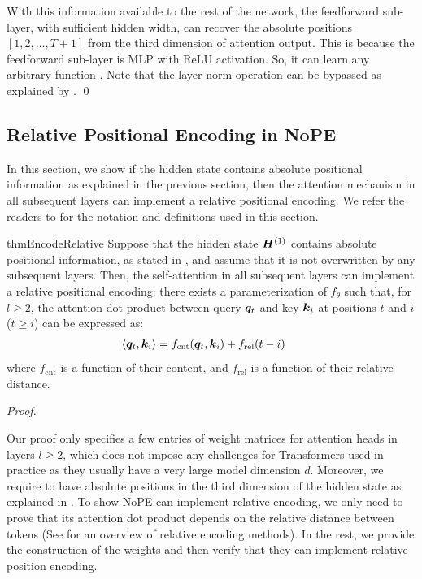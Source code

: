 \documentclass{article}
\begin{document}
With this information available to the rest of the network, the feedforward sub-layer, with sufficient hidden width, can recover the absolute positions $[1, 2, \dots, T+1]$ from the third dimension of attention output. This is because the feedforward sub-layer is MLP with ReLU activation. So, it can learn any arbitrary function \citep{Park2020:UniversalApproximation}. Note that the layer-norm operation can be bypassed as explained by \citet{Ekin2023:InContetLearning}. \qed

\subsection{Relative Positional Encoding in NoPE}
\label{sec:nope_relative_encoding_proof}
In this section, we show if the hidden state contains absolute positional information as explained in the previous section, then the attention mechanism in all subsequent layers can implement a relative positional encoding. We refer the readers to  for the notation and definitions used in this section.
\begin{mdframed}[style=MyFrame2]
  \begin{restatable*}{thm}{EncodeRelative}
    Suppose that the hidden state ${\bm{H}}^{(1)}$ contains absolute positional information, as stated in , and assume that it is not overwritten by any subsequent layers.
    Then, the self-attention in all subsequent layers can implement a relative positional encoding:
    there exists a parameterization of $f_\theta$ such that, for $l\ge 2$, the attention dot product between query ${\bm{q}}_t$ and key ${\bm{k}}_i$ at positions $t$ and $i$ ($t \ge i$) can be expressed as:
    \begin{equation}
      \begin{aligned}
        \langle {\bm{q}}_t, {\bm{k}}_i \rangle & = f_\mathrm{cnt}({\bm{q}}_t, {\bm{k}}_i) + f_\mathrm{rel}(t-i) \
      \end{aligned}
    \end{equation}
    where $f_\mathrm{cnt}$ is a function of their content, and $f_\mathrm{rel}$ is a function of their relative distance.
  \end{restatable*}
\end{mdframed}
\textit{Proof.}

Our proof only specifies a few entries of weight matrices for attention heads in layers $l\ge 2$, which does not impose any challenges for Transformers used in practice as they usually have a very large model dimension $d$. Moreover, we require to have absolute positions in the third dimension of the hidden state as explained in . To show NoPE can implement relative encoding, we only need to prove that its attention dot product depends on the relative distance between tokens (See  for an overview of relative encoding methods). In the rest, we provide the construction of the weights and then verify that they can implement relative position encoding.
\end{document}
